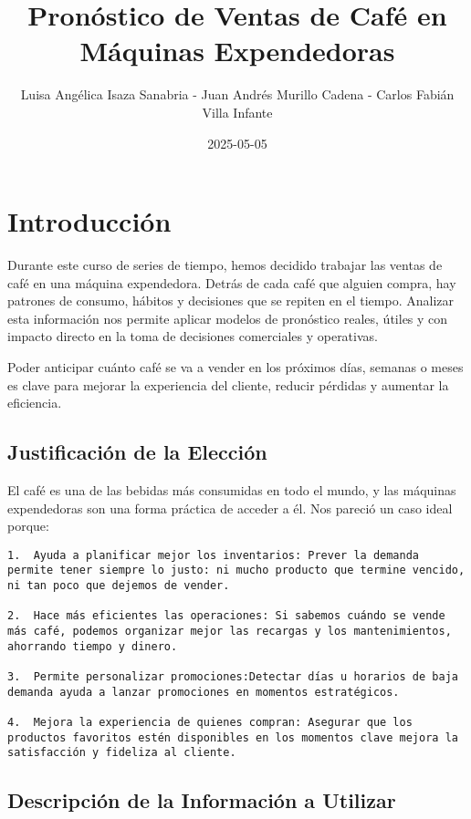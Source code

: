 \documentclass[
]{book}
\title{Pronóstico de Ventas de Café en Máquinas Expendedoras}
\author{Luisa Angélica Isaza Sanabria - Juan Andrés Murillo Cadena - Carlos Fabián Villa Infante}
\date{2025-05-05}
\begin{document}
\maketitle

{
\setcounter{tocdepth}{1}
\tableofcontents
}
\chapter{Introducción}\label{introducciuxf3n}

Durante este curso de series de tiempo, hemos decidido trabajar las ventas de café en una máquina expendedora. Detrás de cada café que alguien compra, hay patrones de consumo, hábitos y decisiones que se repiten en el tiempo. Analizar esta información nos permite aplicar modelos de pronóstico reales, útiles y con impacto directo en la toma de decisiones comerciales y operativas.

Poder anticipar cuánto café se va a vender en los próximos días, semanas o meses es clave para mejorar la experiencia del cliente, reducir pérdidas y aumentar la eficiencia.

\section{Justificación de la Elección}\label{justificaciuxf3n-de-la-elecciuxf3n}

El café es una de las bebidas más consumidas en todo el mundo, y las máquinas expendedoras son una forma práctica de acceder a él. Nos pareció un caso ideal porque:

\begin{verbatim}
1.  Ayuda a planificar mejor los inventarios: Prever la demanda permite tener siempre lo justo: ni mucho producto que termine vencido, ni tan poco que dejemos de vender.

2.  Hace más eficientes las operaciones: Si sabemos cuándo se vende más café, podemos organizar mejor las recargas y los mantenimientos, ahorrando tiempo y dinero.

3.  Permite personalizar promociones:Detectar días u horarios de baja demanda ayuda a lanzar promociones en momentos estratégicos.

4.  Mejora la experiencia de quienes compran: Asegurar que los productos favoritos estén disponibles en los momentos clave mejora la satisfacción y fideliza al cliente.
\end{verbatim}

\section{Descripción de la Información a Utilizar}\label{descripciuxf3n-de-la-informaciuxf3n-a-utilizar}
\end{document}
